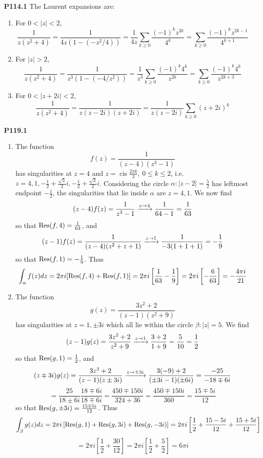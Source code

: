 \documentclass{article}
\def\tbf#1{\textbf{#1}}
\newcommand{\sbr}[1]{\left[#1\right]}
\newcommand{\sep}[1][.5cm]{\vspace{#1}}
\DeclareMathOperator{\cis}{cis}
\begin{document}
\tbf{P114.1} The Laurent expansions are:

\begin{enumerate}[label=(\roman*)]
	
\item For $0<|z|<2$,
$$\frac{1}{z(z^2+4)} = \frac{1}{4z(1-(-z^2/4))}
= \frac{1}{4z}\sum_{k\ge0}\frac{(-1)^kz^{2k}}{4^k}
= \sum_{k\ge0}\frac{(-1)^kz^{2k-1}}{4^{k+1}}$$

\item For $|z|>2$,
$$\frac{1}{z(z^2+4)} = \frac{1}{z^3(1-(-4/z^2))}
= \frac{1}{z^3}\sum_{k\ge0}\frac{(-1)^k4^k}{z^{2k}}
= \sum_{k\ge0}\frac{(-1)^k4^k}{z^{2k+3}}$$

\item For $0<|z+2i|<2$,
$$\frac{1}{z(z^2+4)} = \frac{1}{z(z-2i)(z+2i)}
= \frac{1}{z(z-2i)}\sum_{k\ge0}(z+2i)^k$$

\end{enumerate}
\sep



\tbf{P119.1}

\begin{enumerate}[label=(\roman*)]
	
\item The function
$$f(z) = \frac{1}{(z-4)(z^3-1)}$$
has singularities at $z=4$ and $z=\cis\frac{2\pi k}{3},~0\le k\le 2$, i.e. $z=4,1,-\frac12+\frac{\sqrt3}{2}i,-\frac12+\frac{\sqrt3}{2}i$. Considering the circle $\alpha:|z-2|=\frac52$ has leftmost endpoint $-\frac12$, the singularities that lie inside $\alpha$ are $z=4,1$. We now find
$$(z-4)f(z) = \frac{1}{z^3-1}
\app[z][4] \frac{1}{64-1}
= \frac{1}{63}$$
so that $\Res(f,4)=\frac{1}{63}$, and
$$(z-1)f(z) = \frac{1}{(z-4)(z^2+z+1)}
\app[z][1] \frac{1}{-3(1+1+1)}
= -\frac19$$
so that $\Res(f,1)=-\frac19$. Thus
$$\int_\alpha f(z)dz = 2\pi i[\Res(f,4) + \Res(f,1)]
= 2\pi i\sbr{\frac{1}{63} - \frac19}
= 2\pi i\sbr{-\frac{6}{63}}
= -\frac{4\pi i}{21}$$


\item The function
$$g(z) = \frac{3z^2+2}{(z-1)(z^2+9)}$$
has singularities at $z=1,\pm 3i$ which all lie within the circle $\beta:|z|=5$. We find
$$(z-1)g(z) = \frac{3z^2+2}{z^2+9}
\app[z][1] \frac{3+2}{1+9}
= \frac{5}{10} 
= \frac12$$
so that $\Res(g,1)=\frac12$, and
$$(z\mp 3i)g(z) = \frac{3z^2+2}{(z-1)(z\pm 3i)}
\app[z][\pm 3i] \frac{3(-9)+2}{(\pm 3i-1)(\pm 6i)}
= \frac{-25}{-18\mp 6i}$$
$$= \frac{25}{18\pm 6i}\frac{18\mp 6i}{18\mp 6i}
= \frac{450\mp 150i}{324+36}
= \frac{450\mp 150i}{360}
= \frac{15\mp 5i}{12}$$
so that $\Res(g,\pm 3i)=\frac{15\mp 5i}{12}$. Thus
$$\int_\beta g(z)dz = 2\pi i\sbr{\Res(g,1) + \Res(g,3i) + \Res(g,-3i)}
= 2\pi i\sbr{\frac12 + \frac{15-5i}{12} + \frac{15+5i}{12}}$$
$$= 2\pi i\sbr{\frac12 + \frac{30}{12}}
= 2\pi i\sbr{\frac12 + \frac52}
= 6\pi i$$
	
\end{enumerate}
\sep
\end{document}
